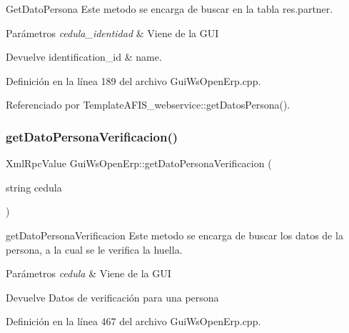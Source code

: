 Get\+Dato\+Persona Este metodo se encarga de buscar en la tabla res.\+partner. 


\begin{DoxyParams}{Parámetros}
{\em cedula\+\_\+identidad} & Viene de la G\+UI \\
\hline
\end{DoxyParams}
\begin{DoxyReturn}{Devuelve}
identification\+\_\+id \& name. 
\end{DoxyReturn}


Definición en la línea 189 del archivo Gui\+Ws\+Open\+Erp.\+cpp.



Referenciado por Template\+A\+F\+I\+S\+\_\+webservice\+::get\+Datos\+Persona().

\hypertarget{classGuiWsOpenErp_a128600b86f70773fb336c6b59c853b42}{}\label{classGuiWsOpenErp_a128600b86f70773fb336c6b59c853b42} 
\subsubsection{\texorpdfstring{get\+Dato\+Persona\+Verificacion()}{getDatoPersonaVerificacion()}}
{\footnotesize\ttfamily Xml\+Rpc\+Value Gui\+Ws\+Open\+Erp\+::get\+Dato\+Persona\+Verificacion (\begin{DoxyParamCaption}\item[{string}]{cedula }\end{DoxyParamCaption})\hspace{0.3cm}{\ttfamily [inline]}}



get\+Dato\+Persona\+Verificacion Este metodo se encarga de buscar los datos de la persona, a la cual se le verifica la huella. 


\begin{DoxyParams}{Parámetros}
{\em cedula} & Viene de la G\+UI \\
\hline
\end{DoxyParams}
\begin{DoxyReturn}{Devuelve}
Datos de verificación para una persona 
\end{DoxyReturn}


Definición en la línea 467 del archivo Gui\+Ws\+Open\+Erp.\+cpp.



